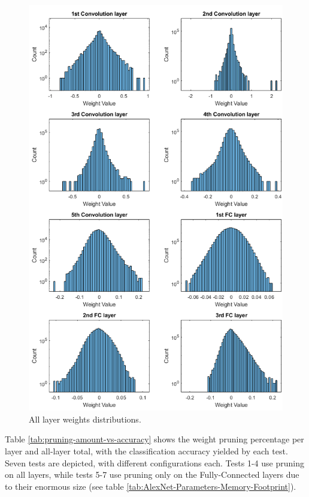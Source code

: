 \begin{figure} [H]
	\centering
	\includegraphics[width=\textwidth]{../Images/Weights-distributions/all-layer-original-weights-distributions.png}
	\decoRule
	\caption[All layer weights distributions]{All layer weights distributions.}
	\label{fig:all-layer-original-weights-distributions}
\end{figure}

Table \ref{tab:pruning-amount-vs-accuracy} shows the weight pruning percentage per layer and all-layer total, with the classification accuracy yielded by each test. Seven tests are depicted, with different configurations each. Tests 1-4 use pruning on all layers, while tests 5-7 use pruning only on the Fully-Connected layers due to their enormous size (see table \ref{tab:AlexNet-Parameters-Memory-Footprint}).

